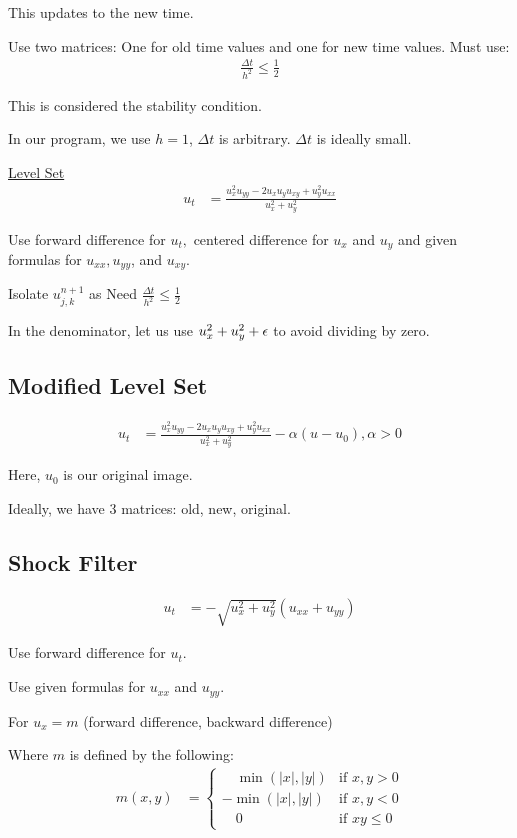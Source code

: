 This updates to the new time.

Use two matrices: One for old time values and one for new time values. Must use:
%
\begin{align}
  \frac{\Delta t}{h^2} \leq \frac{1}{2}
\end{align}

This is considered the stability condition.

In our program, we use $h = 1$, $\Delta t$ is arbitrary. $\Delta t$ is ideally small.

\underline{Level Set}
%
\begin{align}
  u_t & = \frac{u^2_x u_{yy} - 2 u_x u_y u_{xy} + u^2_yu_{xx}}{u^2_x + u^2_y}
\end{align}

Use forward difference for $u_t,$ centered difference for $u_x$ and $u_y$ and given formulas for $u_{xx}, u_{yy}$, and $u_{xy}$.

Isolate $u^{n + 1}_{j, k}$ as
Need $\frac{\Delta t}{h^2} \leq \frac{1}{2}$

In the denominator, let us use $u^2_x + u^2_y + \epsilon$ to avoid dividing by zero.

\subsection{Modified Level Set}
%
\begin{align}
  u_t
  & = \frac
  {u^2_x u_{yy} - 2 u_x u_y u_{xy} + u^2_y u_{xx}}
  {u^2_x + u^2_y} - \alpha(u - u_0),  \alpha > 0
\end{align}

Here, $u_0$ is our original image.

Ideally, we have 3 matrices: old, new, original.

\subsection{Shock Filter}
%
\begin{align}
  u_t & = -\sqrt{u^2_x + u^2_y} (u_{xx} + u_{yy})
\end{align}

Use forward difference for $u_t$.

Use given formulas for $u_{xx}$ and $u_{yy}$.

For $u_x = m$ (forward difference, backward difference) %

Where $m$ is defined by the following:
%
\begin{align}
  m(x, y) & =
  \begin{cases}
    \quad \min(|x|, |y|)  & \text{if } x, y > 0\\
    -\min(|x|, |y|)       & \text{if } x, y < 0\\
    \quad 0               & \text{if } xy \leq 0
  \end{cases}
\end{align}

